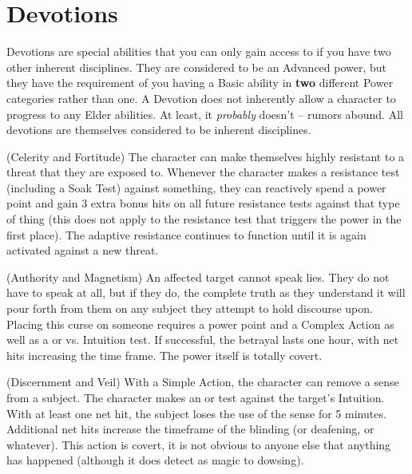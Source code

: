 \section{Devotions}

\hspace{\parindent} Devotions are special abilities that you can only gain access to if you have two other inherent disciplines. They are considered to be an Advanced power, but they have the requirement of you having a Basic ability in \textbf{two} different Power categories rather than one. A Devotion does not inherently allow a character to progress to any Elder abilities. At least, it \textit{probably} doesn't -- rumors abound. All devotions are themselves considered to be inherent disciplines.

 (Celerity and Fortitude)
The character can make themselves highly resistant to a threat that they are exposed to. Whenever the character makes a resistance test (including a Soak Test) against something, they can reactively spend a power point and gain 3 extra bonus hits on all future resistance tests against that type of thing (this does not apply to the resistance test that triggers the power in the first place). The adaptive resistance continues to function until it is again activated against a new threat.


 (Authority and Magnetism)
An affected target cannot speak lies. They do not have to speak at all, but if they do, the complete truth as they understand it will pour forth from them on any subject they attempt to hold discourse upon. Placing this curse on someone requires a power point and a Complex Action as well as a  or  vs. Intuition test. If successful, the betrayal lasts one hour, with net hits increasing the time frame. The power itself is totally covert.

 (Discernment and Veil)
With a Simple Action, the character can remove a sense from a subject. The character makes an  or  test against the target's Intuition. With at least one net hit, the subject loses the use of the sense for 5 minutes. Additional net hits increase the timeframe of the blinding (or deafening, or whatever). This action is covert, it is not obvious to anyone else that anything has happened (although it does detect as magic to dowsing). 

